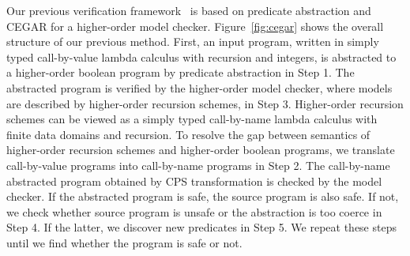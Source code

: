 Our previous verification framework~\cite{KobayashiPLDI2011} is based on
predicate abstraction and CEGAR for a higher-order model checker.
Figure~\ref{fig:cegar} shows the overall structure of our previous
method.  First, an input program, written in simply typed call-by-value
lambda calculus with recursion and integers, is abstracted to a
higher-order boolean program by predicate abstraction in Step 1.  The
abstracted program is verified by the higher-order model checker, where
models are described by higher-order recursion schemes, in Step 3.
Higher-order recursion schemes can be viewed as a simply typed
call-by-name lambda calculus with finite data domains and recursion.  To
resolve the gap between semantics of higher-order recursion schemes and
higher-order boolean programs, we translate call-by-value programs into
call-by-name programs in Step 2.  The call-by-name abstracted program
obtained by CPS transformation is checked by the model checker. If the
abstracted program is safe, the source program is also safe.  If not, we
check whether source program is unsafe or the abstraction is too coerce
in Step 4. If the latter, we discover new predicates in Step 5.  We
repeat these steps until we find whether the program is safe or not.

